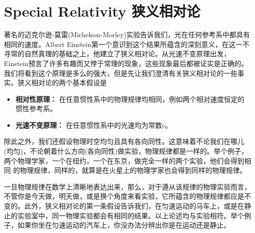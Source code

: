 


\makeatletter 
\newcommand\figcaption{\def\@captype{figure}\caption} 
\newcommand\tabcaption{\def\@captype{table}\caption} 
\makeatother

\chapter[狭义相对论]{Special Relativity 狭义相对论}
\label{chap2} 
著名的迈克尔逊-莫雷(Michelson-Morley)实验告诉我们，光在任何参考系中都具有相同的速度。Albert Einstein第一个意识到这个结果所蕴含的深刻意义，在这一不寻常的自然真理的基础之上，他建立了狭义相对论。从光速不变原理出发，Einstein预言了许多有趣而又悖于常理的现象，这些现象最后都被证实是正确的。我们将看到这个原理是多么的强大，但是先让我们澄清有关狭义相对论的一些事实。狭义相对论的两个基本假设是
\begin{itemize}
	\item {\bf{相对性原理：}} 在任意惯性系中的物理规律均相同，例如两个相对速度恒定的惯性参考系。
	\item {\bf{光速不变原理：}} 在任意惯性系中的光速均为常数$c$。
\end{itemize}
除此之外，我们还假设物理时空均匀且具有各向同性。这意味着不论我们在哪儿(均匀)，不论朝着什么方向(各向同性)做实验，物理规律都是一样的。举个例子，两个物理学家，一个在纽约，一个在东京，做完全一样的两个实验，他们会得到相同
  的物理规律，同样的，就算是在火星上的物理学家也会得到同样的物理规律。

一旦物理规律在数学上清晰地表达出来，那么，对于遵从该规律的物理实验而言，不管你是今天做，明天做，或是换个角度来看实验，它所蕴含的物理规律都应是不变的。此外，狭义相对论的第一条假设告诉我们，在匀速运动的马车上，或是在静止的实验室中，同一物理实验都会有相同的结果。以上论述均与实验相符。举个例子，如果你坐在匀速运动的汽车上，你没办法分辨出你是在运动还是静止。

